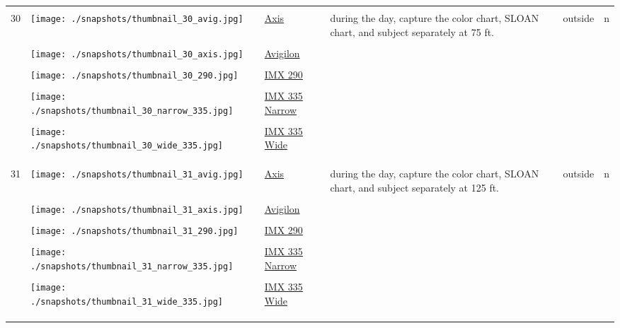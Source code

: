 \documentclass{article}%
\begin{document}
\begin{longtabu}{m{2.5cm} m{4cm} m{2cm} m{4cm} m{2cm} m{2cm}}
&&&&&\\%
\hline%
&&&&&\\%
30&\texttt{[image: ./snapshots/thumbnail\_30\_avig.jpg]}&\href{https://google.com}{Axis}&during the day, capture the color chart, SLOAN chart, and subject separately at 75 ft.&outside&n\\%
&&&&&\\%
&\texttt{[image: ./snapshots/thumbnail\_30\_axis.jpg]}&\href{https://google.com}{Avigilon}&&&\\%
&&&&&\\%
&\texttt{[image: ./snapshots/thumbnail\_30\_290.jpg]}&\href{https://google.com}{IMX 290}&&&\\%
&&&&&\\%
&\texttt{[image: ./snapshots/thumbnail\_30\_narrow\_335.jpg]}&\href{https://google.com}{IMX 335 Narrow}&&&\\%
&&&&&\\%
&\texttt{[image: ./snapshots/thumbnail\_30\_wide\_335.jpg]}&\href{https://google.com}{IMX 335 Wide}&&&\\%
&&&&&\\%
&&&&&\\%
\hline%
&&&&&\\%
31&\texttt{[image: ./snapshots/thumbnail\_31\_avig.jpg]}&\href{https://google.com}{Axis}&during the day, capture the color chart, SLOAN chart, and subject separately at 125 ft.&outside&n\\%
&&&&&\\%
&\texttt{[image: ./snapshots/thumbnail\_31\_axis.jpg]}&\href{https://google.com}{Avigilon}&&&\\%
&&&&&\\%
&\texttt{[image: ./snapshots/thumbnail\_31\_290.jpg]}&\href{https://google.com}{IMX 290}&&&\\%
&&&&&\\%
&\texttt{[image: ./snapshots/thumbnail\_31\_narrow\_335.jpg]}&\href{https://google.com}{IMX 335 Narrow}&&&\\%
&&&&&\\%
&\texttt{[image: ./snapshots/thumbnail\_31\_wide\_335.jpg]}&\href{https://google.com}{IMX 335 Wide}&&&\\%
&&&&&\\%
&&&&&\\%
\hline%
&&&&&\\%
\end{longtabu}%
\end{document}
